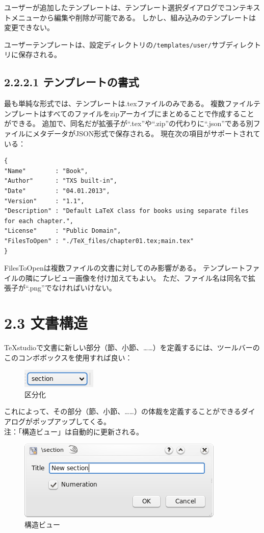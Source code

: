 \documentclass[]{book}
\makeatletter
\def\maxwidth{\ifdim\Gin@nat@width>\linewidth\linewidth
\else\Gin@nat@width\fi}
\let\Oldincludegraphics\includegraphics
\renewcommand{\includegraphics}[1]{\Oldincludegraphics[width=\maxwidth]{#1}}
\makeatother
\begin{document}
ユーザーが追加したテンプレートは、テンプレート選択ダイアログでコンテキストメニューから編集や削除が可能である。
しかし、組み込みのテンプレートは変更できない。

ユーザーテンプレートは、設定ディレクトリの\lstinline!/templates/user/!サブディレクトリに保存される。

\subsection{2.2.2.1 テンプレートの書式}

最も単純な形式では、テンプレートは.texファイルのみである。
複数ファイルテンプレートはすべてのファイルをzipアーカイブにまとめることで作成することができる。
追加で、同名だが拡張子が``.tex''や``.zip''の代わりに``.json''である別ファイルにメタデータがJSON形式で保存される。
現在次の項目がサポートされている：

\begin{lstlisting}
{
"Name"        : "Book",
"Author"      : "TXS built-in",
"Date"        : "04.01.2013",
"Version"     : "1.1",
"Description" : "Default LaTeX class for books using separate files for each chapter.",
"License"     : "Public Domain",
"FilesToOpen" : "./TeX_files/chapter01.tex;main.tex"
}
\end{lstlisting}

FilesToOpenは複数ファイルの文書に対してのみ影響がある。
テンプレートファイルの隣にプレビュー画像を付け加えてもよい。
ただ、ファイル名は同名で拡張子が``.png''でなければいけない。

\section{2.3 文書構造}

TeXstudioで文書に新しい部分（節、小節、\ldots{}\ldots{}）を定義するには、ツールバーのこのコンボボックスを使用すれば良い：

\begin{figure}[htbp]
\centering
\includegraphics{doc3.png}
\caption{区分化}
\end{figure}

これによって、その部分（節、小節、\ldots{}\ldots{}）の体裁を定義することができるダイアログがポップアップしてくる。\\
注：「構造ビュー」は自動的に更新される。

\begin{figure}[htbp]
\centering
\includegraphics{doc4.png}
\caption{構造ビュー}
\end{figure}
\end{document}
